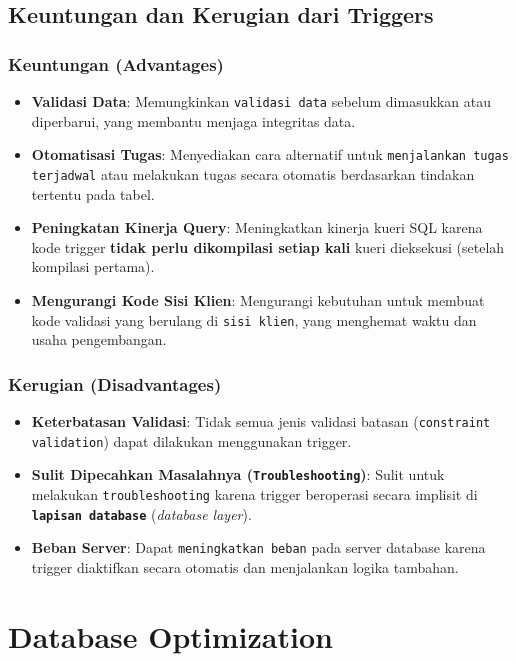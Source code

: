 \documentclass{article}
\begin{document}
\subsection{Keuntungan dan Kerugian dari Triggers}

\subsubsection{Keuntungan (Advantages)}
\begin{itemize}
    \item \textbf{Validasi Data}: Memungkinkan \texttt{validasi data} sebelum dimasukkan atau diperbarui, yang membantu menjaga integritas data.
    \item \textbf{Otomatisasi Tugas}: Menyediakan cara alternatif untuk \texttt{menjalankan tugas terjadwal} atau melakukan tugas secara otomatis berdasarkan tindakan tertentu pada tabel.
    \item \textbf{Peningkatan Kinerja Query}: Meningkatkan kinerja kueri SQL karena kode trigger \textbf{tidak perlu dikompilasi setiap kali} kueri dieksekusi (setelah kompilasi pertama).
    \item \textbf{Mengurangi Kode Sisi Klien}: Mengurangi kebutuhan untuk membuat kode validasi yang berulang di \texttt{sisi klien}, yang menghemat waktu dan usaha pengembangan.
\end{itemize}

\subsubsection{Kerugian (Disadvantages)}
\begin{itemize}
    \item \textbf{Keterbatasan Validasi}: Tidak semua jenis validasi batasan (\texttt{constraint validation}) dapat dilakukan menggunakan trigger.
    \item \textbf{Sulit Dipecahkan Masalahnya (\texttt{Troubleshooting})}: Sulit untuk melakukan \texttt{troubleshooting} karena trigger beroperasi secara implisit di \textbf{\texttt{lapisan database}} (\textit{database layer}).
    \item \textbf{Beban Server}: Dapat \texttt{meningkatkan beban} pada server database karena trigger diaktifkan secara otomatis dan menjalankan logika tambahan.
\end{itemize}

\newpage
\section{Database Optimization}
\end{document}
